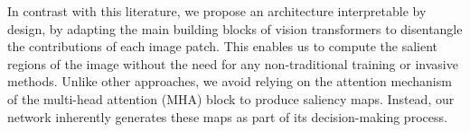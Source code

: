 In contrast with this literature, we propose an architecture interpretable by design, by adapting the main building blocks of vision transformers to disentangle the contributions of each image patch. This enables us to compute the salient regions of the image without the need for any non-traditional training or invasive methods. 
Unlike other approaches, we avoid relying on the attention mechanism of the multi-head attention (MHA) block to produce saliency maps. Instead, our network inherently generates these maps as part of its decision-making process. 
 

